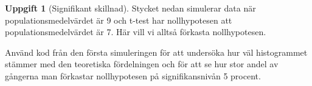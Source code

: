 \documentclass[
]{book}
\newenvironment{Shaded}{\begin{snugshade}}{\end{snugshade}}
\newcommand{\AttributeTok}[1]{\textcolor[rgb]{0.77,0.63,0.00}{#1}}
\newcommand{\ControlFlowTok}[1]{\textcolor[rgb]{0.13,0.29,0.53}{\textbf{#1}}}
\newcommand{\DecValTok}[1]{\textcolor[rgb]{0.00,0.00,0.81}{#1}}
\newcommand{\FunctionTok}[1]{\textcolor[rgb]{0.00,0.00,0.00}{#1}}
\newcommand{\NormalTok}[1]{#1}
\newcommand{\OtherTok}[1]{\textcolor[rgb]{0.56,0.35,0.01}{#1}}
\newcommand{\SpecialCharTok}[1]{\textcolor[rgb]{0.00,0.00,0.00}{#1}}
\theoremstyle{definition}
\theoremstyle{definition}
\theoremstyle{definition}
\newtheorem{exercise}{Uppgift}[chapter]
\theoremstyle{definition}
\theoremstyle{remark}
\begin{document}
\begin{exercise}[Signifikant skillnad]
Stycket nedan simulerar data när populationsmedelvärdet är 9 och t-test har nollhypotesen att populationsmedelvärdet är 7. Här vill vi alltså förkasta nollhypotesen.

\begin{Shaded}
\end{Shaded}

Använd kod från den första simuleringen för att undersöka hur väl histogrammet stämmer med den teoretiska fördelningen och för att se hur stor andel av gångerna man förkastar nollhypotesen på signifikansnivån 5 procent.
\end{exercise}
\end{document}

